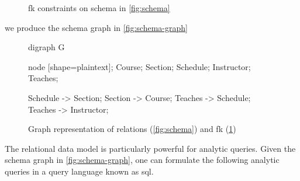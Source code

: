 \begin{ex}
\begin{figure}
				\caption{\gls{fk} constraints on schema in \vref{fig:schema}}
				\label{eqn:fk-constraints}
			\end{figure}
			
			we produce the schema graph in \vref{fig:schema-graph}
			
			\begin{figure}
				\centering
				
				\begin{dot2tex}[neato]
					digraph G {
						node [shape=plaintext]; Course; Section; Schedule; Instructor; Teaches;
						
						Schedule -> Section;
						Section -> Course;
						Teaches -> Schedule;
						Teaches -> Instructor;
					}
				\end{dot2tex}
				
				\caption{Graph representation of relations (\cref{fig:schema}) and \gls{fk} (\cref{eqn:fk-constraints})}
				\label{fig:schema-graph}
			\end{figure}
		\end{ex}
		
		The relational data model is particularly powerful for analytic queries.  Given the schema graph in \vref{fig:schema-graph}, one can formulate the following analytic queries in a query language known as \gls{sql}.
			
